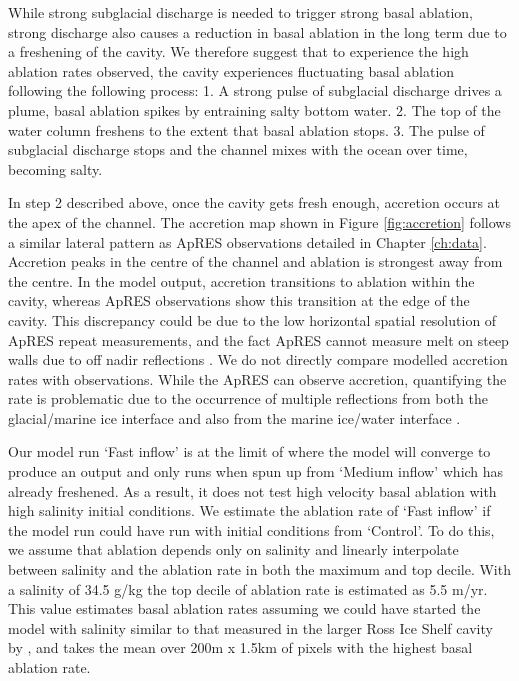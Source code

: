 While strong subglacial discharge is needed to trigger strong basal ablation, strong discharge also causes a reduction in basal ablation in the long term due to a freshening of the cavity. We therefore suggest that to experience the high ablation rates observed, the cavity experiences fluctuating basal ablation following the following process: 1. A strong pulse of subglacial discharge drives a plume, basal ablation spikes by entraining salty bottom water. 2. The top of the water column freshens to the extent that basal ablation stops.  3. The pulse of subglacial discharge stops and the channel mixes with the ocean over time, becoming salty.

In step 2 described above, once the cavity gets fresh enough, accretion occurs at the apex of the channel. The accretion map shown in Figure \ref{fig:accretion} follows a similar lateral pattern as ApRES observations detailed in Chapter \ref{ch:data}. 
Accretion peaks in the centre of the channel and ablation is strongest away from the centre. In the model output, accretion transitions to ablation within the cavity, whereas ApRES observations show this transition at the edge of the cavity.
This discrepancy could be due to the low horizontal spatial resolution of ApRES repeat measurements, and the fact ApRES cannot measure melt on steep walls due to off nadir reflections \citep{vavnkova2021deriving}. We do not directly compare modelled accretion rates with observations. While the ApRES can observe accretion, quantifying the rate is problematic due to the occurrence of multiple reflections from both the glacial/marine ice interface and also from the marine ice/water interface \citep{vavnkova2021nature}.


Our model run `Fast inflow' is at the limit of where the model will converge to produce an output and only runs when spun up from `Medium inflow' which has already freshened. As a result, it does not test high velocity basal ablation with high salinity initial conditions. We estimate the ablation rate of `Fast inflow' if the model run could have run with initial conditions from `Control'. To do this, we assume that ablation depends only on salinity and linearly interpolate between salinity and the ablation rate in both the maximum and top decile. With a salinity of 34.5 g/kg the top decile of ablation rate is estimated as 5.5 m/yr. This value estimates basal ablation rates assuming we could have started the model with salinity similar to that measured in the larger Ross Ice Shelf cavity by \cite{robinson2020ice}, and takes the mean over 200m x 1.5km of pixels with the highest basal ablation rate. 


